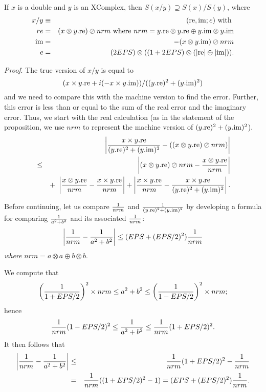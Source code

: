 If $x$ is a double and $y$ is an {\rm XComplex,} then
$S(x / y) \supseteq S(x) / S(y)${\rm ,} where
\begin{eqnarray*}
x  / y & \equiv& ({\rm re},{\rm im};e)\hbox{ with }\\
re& =& (x  \otimes y.{\rm re})\oslash nrm \hbox{ where $nrm = y.{\rm re} \otimes y.{\rm re} \oplus y.{\rm im} \otimes
y.{\rm im}$}
\\
{\rm im} &=& -(x  \otimes y.{\rm im}) \oslash nrm\\
e& =& (2EPS) \otimes ((1 +  2EPS)\otimes(|{\rm re}| \oplus |{\rm im}|)).
\end{eqnarray*}
\endproclaim

{\it Proof}.
The true version of $x/y$ is equal to  
$$(x \times y.{\rm re} + i (-x \times y.{\rm im}))/ ((y.{\rm re})^2 + (y.{\rm im})^2)$$ and we need to compare this with the
machine version to find the error.  Further, this error is less than or equal to the sum of the real error and the imaginary
error. Thus, we start with the real calculation (as in the statement of the proposition, we use $nrm$ to represent the
machine version of $(y.{\rm re})^2 + (y.{\rm im})^2$).
\begin{eqnarray*}
&&\hskip-36pt \left|{x \times y.{\rm re}  \over (y.{\rm re})^2 + (y.{\rm im})^2} - ((x \otimes y.{\rm re})\oslash
nrm)\right|\\
&
\le &\left|(x
\otimes y.{\rm re}) \oslash nrm - {x \otimes y.{\rm re} \over nrm}\right|\\
&& +\ \left|{x \otimes y.{\rm re} \over nrm} - {x
\times y.{\rm re}
\over nrm}\right| + \left|{x \times y.{\rm re} \over nrm} - 
{x \times y.{\rm re}  \over (y.{\rm re})^2 + (y.{\rm im})^2}\right|.
\end{eqnarray*}
 
Before continuing, let us compare ${1 \over nrm}$ and ${1 \over (y.{\rm re})^2 + (y.{\rm im})^2}$ by developing a formula for
comparing ${1 \over a^2 + b^2}$ and its associated ${1 \over nrm}$:
 $$\left|{1 \over nrm} - {1 \over a^2 + b^2}\right| \le   (EPS + (EPS/2)^2) {1 \over nrm}$$
{\it where} $nrm = a\otimes a \oplus b \otimes b.$
\endproclaim

We compute that 
$$\left({1 \over 1 + EPS/2}\right)^2 \times nrm
\le a^2 + b^2 
\le \left({1 \over 1 - EPS/2}\right)^2 \times nrm;$$ hence 
$${1 \over nrm} (1 - EPS/2)^2 
\le {1 \over a^2 + b^2}
\le {1 \over nrm} (1 + EPS/2)^2.$$  It then follows that 
\begin{eqnarray*}
\left|{1 \over nrm} - {1 \over a^2 + b^2}\right|& \le &
    {1 \over nrm} (1 + EPS/2)^2 - {1 \over nrm}\\
&=& {1 \over nrm} ((1 + EPS/2)^2 - 1) =
  (EPS + (EPS/2)^2){1 \over nrm} .\\
\noalign{\vskip-24pt}
\end{eqnarray*}
\enddemo

